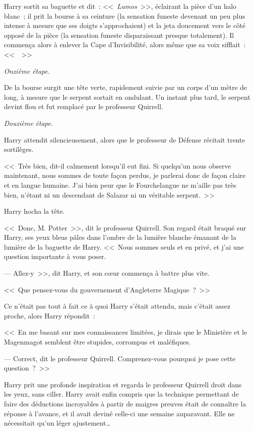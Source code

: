 Harry sortit sa baguette et dit~: <<~\emph{Lumos}~>>, éclairant la pièce d'un halo blanc~; il prit la bourse à sa ceinture (la sensation funeste devenant un peu plus intense à mesure que ses doigts s'approchaient) et la jeta doucement vers le côté opposé de la pièce (la sensation funeste disparaissant presque totalement). Il commença alors à enlever la Cape d'Invisibilité, alors même que sa voix sifflait~: <<~~>>

\emph{Onzième étape.}

De la bourse surgit une tête verte, rapidement suivie par un corps d'un mètre de long, à mesure que le serpent sortait en ondulant. Un instant plus tard, le serpent devint flou et fut remplacé par le professeur Quirrell.

\emph{Douzième étape.}

Harry attendit silencieusement, alors que le professeur de Défense récitait trente sortilèges.

<<~Très bien, dit-il calmement lorsqu'il eut fini. Si quelqu'un nous observe maintenant, nous sommes de toute façon perdus, je parlerai donc de façon claire et en langue humaine. J'ai bien peur que le Fourchelangue ne m'aille pas très bien, n'étant ni un descendant de Salazar ni un véritable serpent.~>>

Harry hocha la tête.

<<~Donc, M. Potter~>>, dit le professeur Quirrell. Son regard était braqué sur Harry, ses yeux bleus pâles dans l'ombre de la lumière blanche émanant de la lumière de la baguette de Harry. <<~Nous sommes seuls et en privé, et j'ai une question importante à vous poser.

--- Allez-y~>>, dit Harry, et son cœur commença à battre plus vite.

<<~Que pensez-vous du gouvernement d'Angleterre Magique~?~>>

Ce n'était pas tout à fait ce à quoi Harry s'était attendu, mais c'était assez proche, alors Harry répondit~:

<<~En me basant sur mes connaissances limitées, je dirais que le Ministère et le Magenmagot semblent être stupides, corrompus et maléfiques.

--- Correct, dit le professeur Quirrell. Comprenez-vous pourquoi je pose cette question~?~>>

Harry prit une profonde inspiration et regarda le professeur Quirrell droit dans les yeux, sans ciller. Harry avait enfin compris que la technique permettant de faire des déductions incroyables à partir de maigres preuves était de connaître la réponse à l'avance, et il avait deviné celle-ci une semaine auparavant. Elle ne nécessitait qu'un léger ajustement…

